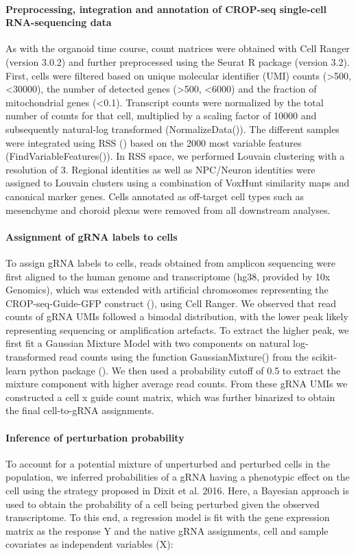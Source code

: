  
\paragraph{Preprocessing, integration and annotation of CROP-seq single-cell RNA-sequencing data}
As with the organoid time course, count matrices were obtained with Cell Ranger (version 3.0.2) and further preprocessed using the Seurat R package (version 3.2). First, cells were filtered based on unique molecular identifier (UMI) counts (>500, <30000), the number of detected genes (>500, <6000) and the fraction of mitochondrial genes (<0.1). Transcript counts were normalized by the total number of counts for that cell, multiplied by a scaling factor of 10000 and subsequently natural-log transformed (NormalizeData()). The different samples were integrated using RSS (\cite{he_css_2020}) based on the 2000 most variable features (FindVariableFeatures()). In RSS space, we performed Louvain clustering with a resolution of 3. Regional identities as well as NPC/Neuron identities were assigned to Louvain clusters using a combination of VoxHunt similarity maps and canonical marker genes. Cells annotated as off-target cell types such as mesenchyme and choroid plexus were removed from all downstream analyses.
 
\paragraph{Assignment of gRNA labels to cells}
To assign gRNA labels to cells, reads obtained from amplicon sequencing were first aligned to the human genome and transcriptome (hg38, provided by 10x Genomics), which was extended with artificial chromosomes representing the CROP-seq-Guide-GFP construct (\cite{datlinger_pooled_2017}), using Cell Ranger. We observed that read counts of gRNA UMIs followed a bimodal distribution, with the lower peak likely representing sequencing or amplification artefacts. To extract the higher peak, we first fit a Gaussian Mixture Model with two components on natural log-transformed read counts using the function GaussianMixture() from the scikit-learn python package (\cite{garreta_learning_2013}). We then used a probability cutoff of 0.5 to extract the mixture component with higher average read counts. From these gRNA UMIs we constructed a cell x guide count matrix, which was further binarized to obtain the final cell-to-gRNA assignments.
 
\paragraph{Inference of perturbation probability}
To account for a potential mixture of unperturbed and perturbed cells in the population, we inferred probabilities of a gRNA having a phenotypic effect on the cell using the strategy proposed in Dixit et al. 2016. Here, a Bayesian approach is used to obtain the probability of a cell being perturbed given the observed transcriptome. To this end, a regression model is fit with the gene expression matrix as the response Y and the native gRNA assignments, cell and sample covariates as independent variables (X):

